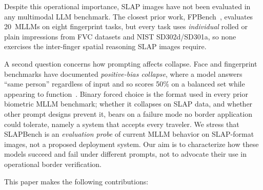 \documentclass[runningheads]{llncs}
\begin{document}
Despite this operational importance, SLAP images have not been evaluated in
any multimodal LLM benchmark. The closest prior work, FPBench~\cite{fpbench2025},
evaluates 20~MLLMs on eight fingerprint tasks, but every task uses
\emph{individual} rolled or plain impressions from FVC datasets and NIST
SD302d/SD301a, so none exercises the inter-finger spatial reasoning SLAP
images require.

A second question concerns how prompting affects collapse. Face and
fingerprint benchmarks have documented \emph{positive-bias collapse}, where a
model answers ``same person'' regardless of input and so scores 50\% on a
balanced set while appearing to function~\cite{facerecbench2025,fpbench2025}.
Binary forced choice is the format used in every prior biometric MLLM
benchmark; whether it collapses on SLAP data, and whether other prompt designs
prevent it, bears on a failure mode no border application could tolerate,
namely a system that accepts every traveler.
We stress that SLAPBench is an \emph{evaluation probe} of current MLLM
behavior on SLAP-format images, not a proposed deployment system. Our aim
is to characterize how these models succeed and fail under different
prompts, not to advocate their use in operational border verification.

This paper makes the following contributions:
\end{document}
